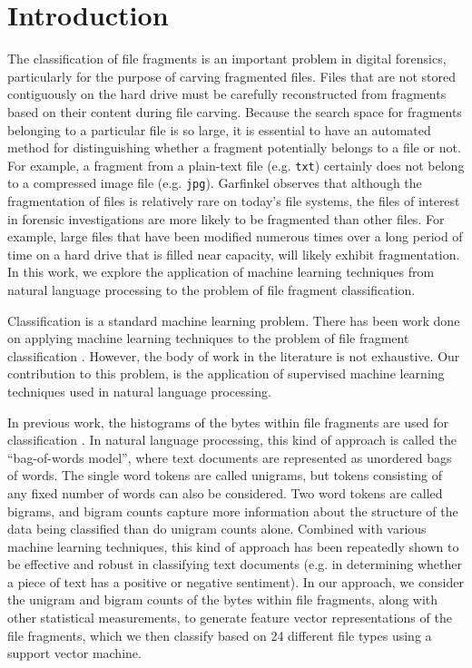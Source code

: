 \documentclass[5p]{elsarticle}
\begin{document}

\section{Introduction}
\label{Section:Introduction}
The classification of file fragments is an important problem in digital forensics, particularly for the purpose of carving fragmented files. Files that are not stored contiguously on the hard drive must be carefully reconstructed from fragments based on their content during file carving. Because the search space for fragments belonging to a particular file is so large, it is essential to have an automated method for distinguishing whether a fragment potentially belongs to a file or not. For example, a fragment from a plain-text file (e.g. \texttt{txt}) certainly does not belong to a compressed image file (e.g. \texttt{jpg}). Garfinkel \cite{Garfinkel07} observes that although the fragmentation of files is relatively rare on today's file systems, the files of interest in forensic investigations are more likely to be fragmented than other files. For example, large files that have been modified numerous times over a long period of time on a hard drive that is filled near capacity, will likely exhibit fragmentation. In this work, we explore the application of machine learning techniques from natural language processing to the problem of file fragment classification.

Classification is a standard machine learning problem. There has been work done on applying machine learning techniques to the problem of file fragment classification \cite{Axelsson10, Conti10, Li10, Veenman07}. However, the body of work in the literature is not exhaustive. Our contribution to this problem, is the application of supervised machine learning techniques used in natural language processing.

In previous work, the histograms of the bytes within file fragments are used for classification \cite{Li05, Li10, Stolfo05, Veenman07}. In natural language processing, this kind of approach is called the ``bag-of-words model'', where text documents are represented as unordered bags of words. The single word tokens are called unigrams, but tokens consisting of any fixed number of words can also be considered. Two word tokens are called bigrams, and bigram counts capture more information about the structure of the data being classified than do unigram counts alone. Combined with various machine learning techniques, this kind of approach has been repeatedly shown to be effective and robust in classifying text documents (e.g. in determining whether a piece of text has a positive or negative sentiment). In our approach, we consider the unigram and bigram counts of the bytes within file fragments, along with other statistical measurements, to generate feature vector representations of the file fragments, which we then classify based on 24 different file types using a support vector machine.
\end{document}
